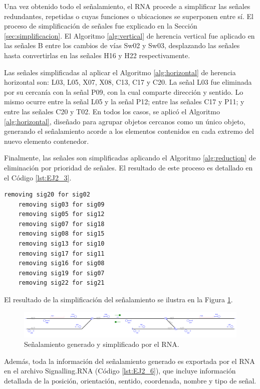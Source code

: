 	Una vez obtenido todo el señalamiento, el RNA procede a simplificar las señales redundantes, repetidas o cuyas funciones o ubicaciones se superponen entre sí. El proceso de simplificación de señales fue explicado en la Sección \ref{sec:simplificacion}. El Algoritmo \ref{alg:vertical} de herencia vertical fue aplicado en las señales B entre los cambios de vías Sw02 y Sw03, desplazando las señales hasta convertirlas en las señales H16 y H22 respectivamente.
	
	Las señales simplificadas al aplicar el Algoritmo \ref{alg:horizontal} de herencia horizontal son: L03, L05, X07, X08, C13, C17 y C20. La señal L03 fue eliminada por su cercanía con la señal P09, con la cual comparte dirección y sentido. Lo mismo ocurre entre la señal L05 y la señal P12; entre las señales C17 y P11; y entre las señales C20 y T02. En todos los casos, se aplicó el Algoritmo \ref{alg:horizontal}, diseñado para agrupar objetos cercanos como un único objeto, generando el señalamiento acorde a los elementos contenidos en cada extremo del nuevo elemento contenedor.
	
	Finalmente, las señales son simplificadas aplicando el Algoritmo \ref{alg:reduction} de eliminación por prioridad de señales. El resultado de este proceso es detallado en el Código \ref{lst:EJ2_3}.
	
	\begin{lstlisting}[language = {}, caption = Reducción de señalamiento por prioridad de señales, label = {lst:EJ2_3}]
	removing sig20 for sig02
	removing sig03 for sig09
	removing sig05 for sig12
	removing sig07 for sig18
	removing sig08 for sig15
	removing sig13 for sig10
	removing sig17 for sig11
	removing sig16 for sig08
	removing sig19 for sig07
	removing sig22 for sig21
	\end{lstlisting}

	El resultado de la simplificación del señalamiento se ilustra en la Figura \ref{fig:EJ2_7}.

	 \begin{figure}[H]
		\centering
		\includegraphics[width=1\textwidth]{resultados-obtenidos/ejemplo2/images/2_RNA.png}
		\centering\caption{Señalamiento generado y simplificado por el RNA.}
		\label{fig:EJ2_7}
	\end{figure}
	
	Además, toda la información del señalamiento generado es exportada por el RNA en el archivo Signalling.RNA (Código \ref{lst:EJ2_6}), que incluye información detallada de la posición, orientación, sentido, coordenada, nombre y tipo de señal.
	
